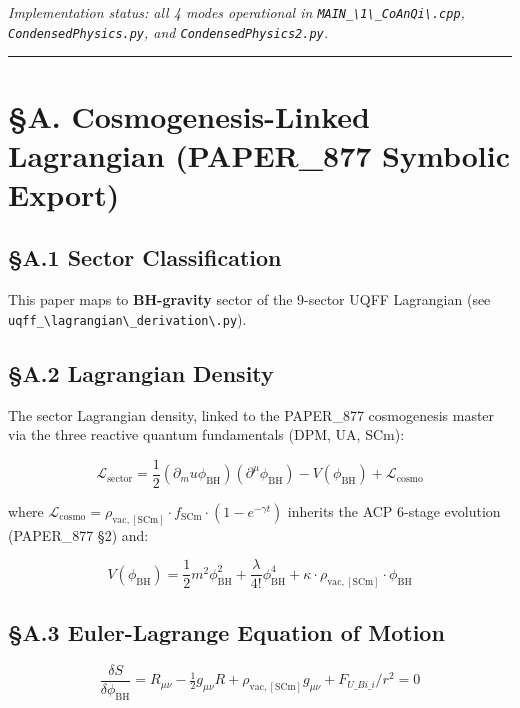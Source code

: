 \documentclass[12pt,a4paper]{article}
\begin{document}
\emph{Implementation status: all 4 modes operational in \texttt{MAIN\_\textbackslash {1\textbackslash \_CoAnQi\textbackslash }.cpp}, \texttt{CondensedPhysics.py}, and \texttt{CondensedPhysics2.py}.}

\medskip\hrule\medskip

\section{\S{}A. Cosmogenesis-Linked Lagrangian (PAPER\_877 Symbolic Export)}

\subsection{\S{}A.1 Sector Classification}

This paper maps to \textbf{BH-gravity} sector of the 9-sector UQFF Lagrangian (see \texttt{uqff\_\textbackslash {lagrangian\textbackslash \_derivation\textbackslash }.py}).

\subsection{\S{}A.2 Lagrangian Density}

The sector Lagrangian density, linked to the PAPER\_877 cosmogenesis master via the three reactive quantum fundamentals (DPM, UA, SCm):

\begin{equation}
\mathcal{L}_{\mathrm{sector}} = \frac{1}{2}(\partial_mu \phi_{\mathrm{BH}})(\partial^\mu \phi_{\mathrm{BH}}) - V(\phi_{\mathrm{BH}}) + \mathcal{L}_{\mathrm{cosmo}}
\end{equation}

where $\mathcal{L}_{\mathrm{cosmo}} = \rho_{\mathrm{vac,[SCm]}} \cdot f_{\mathrm{SCm}} \cdot (1 - e^{-\gamma t})$ inherits the ACP 6-stage evolution (PAPER\_877 \S{}2) and:

\begin{equation}
V(\phi_{\mathrm{BH}}) = \frac{1}{2} m^2 \phi_{\mathrm{BH}}^2 + \frac{\lambda}{4!} \phi_{\mathrm{BH}}^4 + \kappa \cdot \rho_{\mathrm{vac,[SCm]}} \cdot \phi_{\mathrm{BH}}
\end{equation}

\subsection{\S{}A.3 Euler-Lagrange Equation of Motion}

\begin{equation}
\boxed{\frac{\delta S}{\delta \phi_{\mathrm{BH}}} = R_{\mu\nu} - \tfrac{1}{2}g_{\mu\nu}R + \rho_{\mathrm{vac,[SCm]}} g_{\mu\nu} + F_{U\_Bi\_i}/r^2 = 0}
\end{equation}
\end{document}
